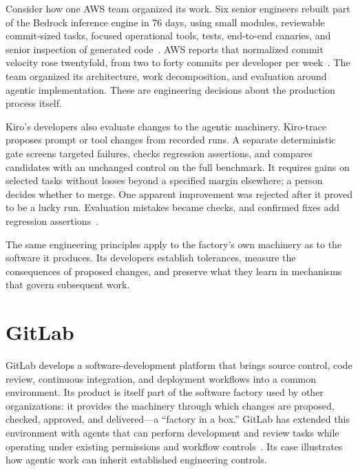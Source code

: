 
Consider how one AWS team organized its work. Six senior engineers rebuilt part of the Bedrock inference engine in 76 days, using small modules, reviewable commit-sized tasks, focused operational tools, tests, end-to-end canaries, and senior inspection of generated code~\citep{kiro2026bedrock}. AWS reports that normalized commit velocity rose twentyfold, from two to forty commits per developer per week~\citep{sivasubramanian2026frontier}. The team organized its architecture, work decomposition, and evaluation around agentic implementation. These are engineering decisions about the production process itself.


Kiro's developers also evaluate changes to the agentic machinery. Kiro-trace proposes prompt or tool changes from recorded runs. A separate deterministic gate screens targeted failures, checks regression assertions, and compares candidates with an unchanged control on the full benchmark. It requires gains on selected tasks without losses beyond a specified margin elsewhere; a person decides whether to merge. One apparent improvement was rejected after it proved to be a lucky run. Evaluation mistakes became checks, and confirmed fixes add regression assertions~\citep{kim2026kirotrace}.

The same engineering principles apply to the factory's own machinery as to the software it produces. Its developers establish tolerances, measure the consequences of proposed changes, and preserve what they learn in mechanisms that govern subsequent work.

\section{GitLab}\label{heading:gitlab}

GitLab develops a software-development platform that brings source control, code review, continuous integration, and deployment workflows into a common environment. Its product is itself part of the software factory used by other organizations: it provides the machinery through which changes are proposed, checked, approved, and delivered---a ``factory in a box.'' GitLab has extended this environment with agents that can perform development and review tasks while operating under existing permissions and workflow controls~\citep{gitlab2026customize,gitlab2026identity}. Its case illustrates how agentic work can inherit established engineering controls.

